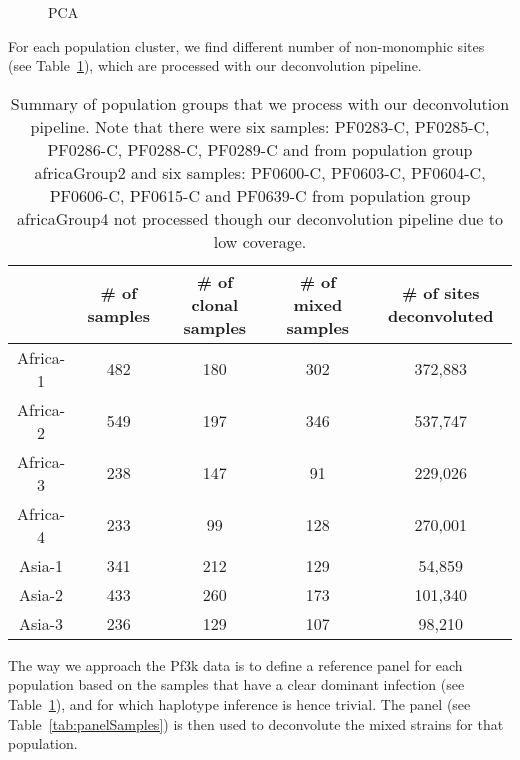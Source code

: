 \documentclass{article}
\begin{document}
\begin{figure}[h]
\centering
{}
\caption{PCA}\label{fig:pca}
\end{figure}


For each population cluster, we find different number of non-monomphic sites (see Table~\ref{tab:sevenGroups}), which are processed with our deconvolution pipeline.

\begin{table}[ht]
\centering
\begin{tabular}{|c|c|c|c|c|}
\hline\hline
        & \# of samples  & \# of clonal samples & \# of mixed samples & \# of sites deconvoluted\\
        \hline
Africa-1 & 482 & 180 & 302 & 372,883 \\
Africa-2 & 549 & 197 & 346 & 537,747 \\
Africa-3	& 238 & 147 & 91  & 229,026 \\
Africa-4	& 233 & 99  & 128 & 270,001 \\
Asia-1	  & 341 & 212 & 129 & 54,859  \\
Asia-2	  & 433 & 260 & 173 & 101,340 \\
Asia-3	  & 236 & 129 & 107 & 98,210  \\
\hline
\hline
\end{tabular}
\caption{Summary of population groups that we process with our deconvolution pipeline. Note that there were six samples: PF0283-C, PF0285-C, PF0286-C, PF0288-C, PF0289-C and from population group africaGroup2 and six samples: PF0600-C, PF0603-C, PF0604-C, PF0606-C, PF0615-C and PF0639-C from population group africaGroup4 not processed though our deconvolution pipeline due to low coverage.}\label{tab:sevenGroups}
\end{table}

The way we approach the Pf3k data is to define a reference panel for each population based on the samples that have a clear dominant infection (see Table~\ref{tab:sevenGroups}), and for which haplotype inference is hence trivial. The panel (see Table~\ref{tab:panelSamples}) is then used to deconvolute the mixed strains for that population.
\end{document}
